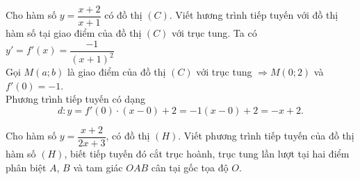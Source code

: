 \begin{bt}%
	Cho hàm số $y=\dfrac{x+2}{x+1}$ có đồ thị $(C)$. Viết hương trình tiếp tuyến với đồ thị hàm số tại giao điểm của đồ thị $(C)$ với trục tung.
	\loigiai
	{
		Ta có $y'=f'(x)=\dfrac{-1}{(x+1)^2}$\\
		Gọi $M(a;b)$ là giao điểm của đồ thị $(C)$ với trục tung $\Rightarrow M(0;2)$ và $f'(0)=-1$.\\
		Phương trình tiếp tuyến có dạng
		\[d\colon y=f'(0)\cdot(x-0)+2=-1(x-0)+2=-x+2.\]
	}
\end{bt}

\begin{bt}%
	Cho hàm số $y = \dfrac{x+2}{2x+3}$, có đồ thị $\left( H \right)$. Viết phương trình tiếp tuyến của đồ thị hàm số $\left( H \right)$, biết tiếp tuyến đó cắt trục hoành, trục tung lần lượt tại hai điểm phân biệt $A$, $B$ và tam giác $OAB$ cân tại gốc tọa độ $O$.
\end{bt}
